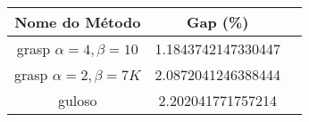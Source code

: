 \begin{table}[]
\begin{tabular}{|c|c|c|}
\hline
Nome do Método & Gap (\%) \\ \hline
grasp $\alpha=4,\beta=10$ & 1.1843742147330447\\ \hline
grasp $\alpha=2,\beta=7K$ & 2.0872041246388444\\ \hline
guloso & 2.202041771757214
\end{tabular}
\end{table}
